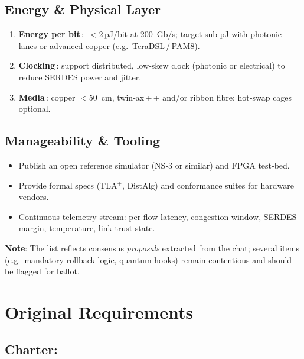 \documentclass[../../../OAE-SPEC-MAIN.tex]{subfiles}
\begin{document}
\subsection{Energy \& Physical Layer}
\begin{enumerate}%
  \item \textbf{Energy per bit}\,: \,$<$2\,pJ/bit at 200 Gb/s; target sub‑pJ with photonic lanes or advanced copper (e.g.\ TeraDSL\,/\,PAM8).  
  \item \textbf{Clocking}\,: support distributed, low‑skew clock (photonic or electrical) to reduce SERDES power and jitter.  
  \item \textbf{Media}\,: copper $<$50 cm, twin‑ax\,+\,+ and/or ribbon fibre; hot‑swap cages optional.
\end{enumerate}

\subsection{Manageability \& Tooling}
\begin{itemize}
  \item Publish an open reference simulator (NS‑3 or similar) and FPGA test‑bed.  
  \item Provide formal specs (TLA$^{+}$, DistAlg) and conformance suites for hardware vendors.  
  \item Continuous telemetry stream: per‑flow latency, congestion window, SERDES margin, temperature, link trust‑state.
\end{itemize}

\bigskip
\noindent\textbf{Note}: The list reflects consensus \emph{proposals} extracted from the chat; several items (e.g.\ mandatory rollback logic, quantum hooks) remain contentious and should be flagged for ballot.




\section{Original Requirements}

%




\subsection{Charter:}
\end{document}
